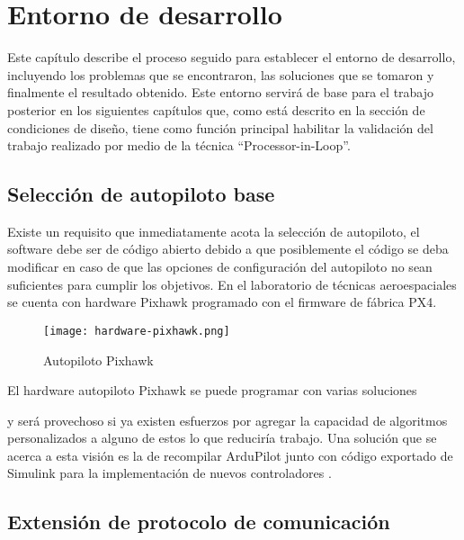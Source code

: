 \chapter{Entorno de desarrollo}

Este capítulo describe el proceso seguido para establecer el entorno de desarrollo, incluyendo los problemas que se encontraron, las soluciones que se tomaron y finalmente el resultado obtenido. Este entorno servirá de base para el trabajo posterior en los siguientes capítulos que, como está descrito en la sección de condiciones de diseño, tiene como función principal habilitar la validación del trabajo realizado por medio de la técnica ``Processor-in-Loop''.

\section{Selección de autopiloto base}

Existe un requisito que inmediatamente acota la selección de autopiloto, el software debe ser de código abierto debido a que posiblemente el código se deba modificar en caso de que las opciones de configuración del autopiloto no sean suficientes para cumplir los objetivos. En el laboratorio de técnicas aeroespaciales se cuenta con hardware Pixhawk programado con el firmware de fábrica PX4.

\begin{figure}[h]
    \centering
    \texttt{[image: hardware-pixhawk.png]}
    \caption{Autopiloto Pixhawk}
    \label{fig:pixhawk1}
\end{figure}

El hardware autopiloto Pixhawk se puede programar con varias soluciones

y será provechoso si ya existen esfuerzos por agregar la capacidad de algoritmos personalizados a alguno de estos lo que reduciría trabajo. Una solución que se acerca a esta visión es la de recompilar ArduPilot junto con código exportado de Simulink para la implementación de nuevos controladores \cite{ardupilot-custom}.

\section{Extensión de protocolo de comunicación}
